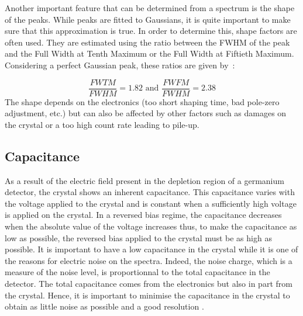 \documentclass[11pt,a4paper]{article}
\begin{document}
Another important feature that can be determined from a spectrum is the shape of the peaks. While peaks are fitted to Gaussians, it is quite important to make sure that this approximation is true. In order to determine this, shape factors are often used. They are estimated using the ratio between the FWHM of the peak and the Full Width at Tenth Maximum or the Full Width at Fiftieth Maximum. Considering a perfect Gaussian peak, these ratios are given by~:

\begin{equation}
\dfrac{FWTM}{FWHM} = 1.82 \text{  and  } \dfrac{FWFM}{FWHM} = 2.38
\end{equation}
The shape depends on the electronics (too short shaping time, bad pole-zero adjustment, etc.) but can also be affected by other factors such as damages on the crystal or a too high count rate leading to pile-up.


\subsection{Capacitance}

As a result of the electric field present in the depletion region of a germanium detector, the crystal shows an inherent capacitance. This capacitance varies with the voltage applied to the crystal and is constant when a sufficiently high voltage is applied on the crystal. In a reversed bias regime, the capacitance decreases when the absolute value of the voltage increases thus, to make the capacitance as low as possible, the reversed bias applied to the crystal must be as high as possible. It is important to have a low capacitance in the crystal while it is one of the reasons for electric noise on the spectra. Indeed, the noise charge, which is a measure of the noise level, is proportionnal to the total capacitance in the detector. The total capacitance comes from the electronics but also in part from the crystal. Hence, it is important to minimise the capacitance in the crystal to obtain as little noise as possible and a good resolution \cite{Kephart}.
\end{document}
